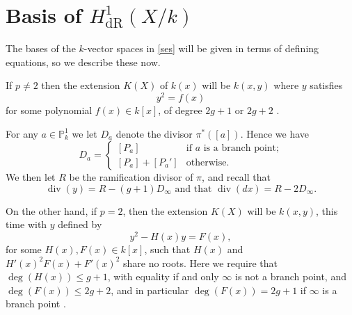 \documentclass[draft, 11pt]{article} %
\theoremstyle{plain}
\theoremstyle{remark}
\newcommand{\cO}{{\cal O}}
\newcommand{\derhamhone}{H_{\text {dR}}^1(X/k)}
\DeclareMathOperator{\di}{div}
\begin{document}
\begin{comment}
In order to do this we will need to use Serre duality, which we briefly remind the reader of presently.
Serre duality states that $H^0(X,\Omega_X)$ and $H^1(X,\cO_X)$ are dual to each other, and that there is a canonical map ${\text Res}:H^0(X,\omega_X) \times H^1(X,\cO_X) \rightarrow k$.
Details of the definition of ${\text Res}$ can be found in appendix B of \todo{in progress}
\todo[inline]{add details - in particular, relate to the basis we have for de rham}
\end{comment}
\section{Basis of $\derhamhone$}

The bases of the $k$-vector spaces in \eqref{ses} will be given in terms of defining equations, so we describe these now.

If $p \neq 2$ then the extension $K(X)$ of $k(x)$ will be $k(x,y)$ where $y$ satisfies
\begin{equation}\label{definingequationpnot2}
y^2 = f(x)
\end{equation}
for some polynomial $f(x) \in k[x]$, of degree $2g+1$ or $2g+2$ \cite[Prop 7.4.24]{liu}.

For any $a\in \mathbb P_k^1$ we let $D_a$ denote the divisor $\pi^*([a])$.
Hence we have
\begin{equation}\label{divisorofpoints}
D_a= 
\begin{cases}
 [P_a] & \text{if $a$ is a branch point;} \\
 [P_a] + [P_a'] & \text{otherwise.}
\end{cases}
\end{equation}
We then let $R$ be the ramification divisor of $\pi$, and recall that 
\begin{equation}\label{pnot2divisors}
\di(y)  = R - (g+1)D_\infty \text{ and that } \di( dx) = R - 2D_\infty.
\end{equation}


On the other hand, if $p=2$, then the extension $K(X)$ will be $k(x,y)$, this time with $y$ defined by
\begin{equation}\label{definep=2}
y^2 - H(x)y = F(x),
\end{equation}
for some $H(x),F(x) \in k[x]$, such that $H(x)$ and $H'(x)^2F(x) + F'(x)^2$ share no roots.
Here we require that $\deg(H(x)) \leq g+1$, with equality if and only $\infty$ is not a branch point, and $\deg(F(x)) \leq 2g+2$, and in particular $\deg(F(x)) = 2g+1$ if $\infty$ is a branch point  \cite[Prop 7.4.24]{liu}.
\end{document}
